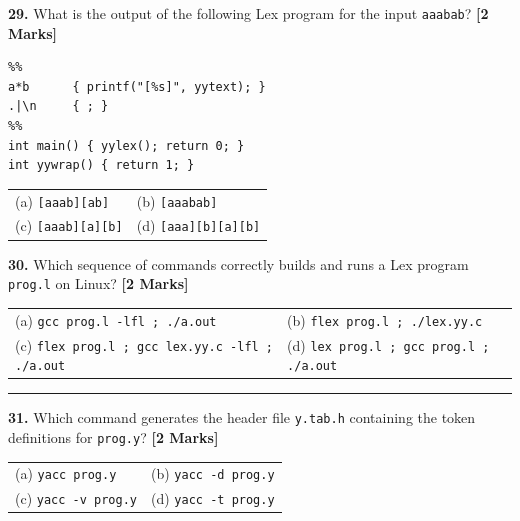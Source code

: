 \documentclass[11pt,a4paper]{article}
\begin{document}
\vspace{0.22cm}

\noindent \textbf{29.} What is the output of the following Lex program for the input \texttt{aaabab}? \hfill \textbf{[2 Marks]}
\begin{lstlisting}
%%
a*b      { printf("[%s]", yytext); }
.|\n     { ; }
%%
int main() { yylex(); return 0; }
int yywrap() { return 1; }
\end{lstlisting}
\vspace{0.06cm}
\noindent
\begin{tabularx}{\textwidth}{@{}X X@{}}
(a) \texttt{[aaab][ab]} & (b) \texttt{[aaabab]} \\[3pt]
(c) \texttt{[aaab][a][b]} & (d) \texttt{[aaa][b][a][b]} \\
\end{tabularx}

\vspace{0.22cm}

\noindent \textbf{30.} Which sequence of commands correctly builds and runs a Lex program \texttt{prog.l} on Linux? \hfill \textbf{[2 Marks]}
\vspace{0.06cm}
\noindent
\begin{tabularx}{\textwidth}{@{}X X@{}}
(a) \texttt{gcc prog.l -lfl ; ./a.out} & (b) \texttt{flex prog.l ; ./lex.yy.c} \\[3pt]
(c) \texttt{flex prog.l ; gcc lex.yy.c -lfl ; ./a.out} & (d) \texttt{lex prog.l ; gcc prog.l ; ./a.out} \\
\end{tabularx}

\vspace{0.25cm}
\noindent\rule{\textwidth}{0.4pt}
\vspace{0.2cm}


\noindent \textbf{31.} Which command generates the header file \texttt{y.tab.h} containing the token definitions for \texttt{prog.y}? \hfill \textbf{[2 Marks]}
\vspace{0.06cm}
\noindent
\begin{tabularx}{\textwidth}{@{}X X@{}}
(a) \texttt{yacc prog.y} & (b) \texttt{yacc -d prog.y} \\[3pt]
(c) \texttt{yacc -v prog.y} & (d) \texttt{yacc -t prog.y} \\
\end{tabularx}
\end{document}
